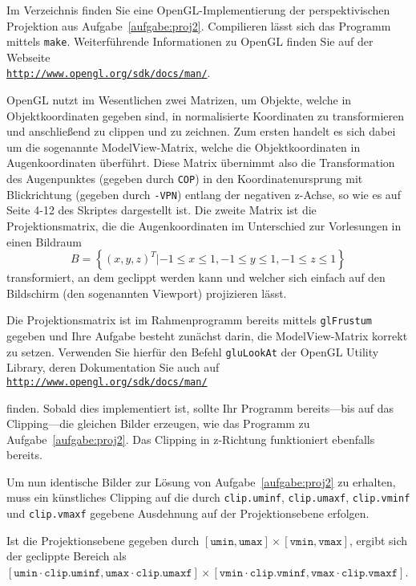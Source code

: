 %
Im Verzeichnis  finden Sie eine 
OpenGL-Implementierung der perspektivischen
Projektion aus Aufgabe~\ref{aufgabe:proj2}. Compilieren lässt sich das 
Programm mittels \texttt{make}. Weiterführende Informationen zu OpenGL 
finden Sie auf der Webseite\\
\href{http://www.opengl.org/sdk/docs/man/}{\texttt{http://www.opengl.org/sdk/docs/man/}}.

OpenGL nutzt im Wesentlichen zwei Matrizen, um Objekte, welche in 
Objektkoordinaten gegeben sind, in normalisierte Koordinaten zu 
transformieren und anschließend zu clippen und zu zeichnen. Zum ersten 
handelt es sich dabei um die sogenannte ModelView-Matrix, welche die 
Objektkoordinaten in Augenkoordinaten überführt. Diese Matrix übernimmt 
also die Transformation des Augenpunktes (gegeben durch \texttt{COP}) in
den Koordinatenursprung mit Blickrichtung (gegeben durch \texttt{-VPN}) 
entlang der negativen z-Achse, so wie es auf Seite 4-12 des Skriptes 
dargestellt ist. Die zweite Matrix ist die Projektionsmatrix, die die 
Augenkoordinaten im Unterschied zur Vorlesungen in einen Bildraum
\[B = \left\{(x,y,z)^T | -1\leq x\leq 1,-1\leq y\leq 1,-1\leq z\leq 1\right\}\] 
transformiert, an dem geclippt werden kann und welcher sich einfach auf 
den Bildschirm (den sogenannten Viewport) projizieren lässt.

Die Projektionsmatrix ist im Rahmenprogramm bereits mittels 
\texttt{glFrustum} gegeben und Ihre Aufgabe besteht zunächst darin, die 
ModelView-Matrix korrekt zu setzen. Verwenden Sie hierfür den Befehl 
\texttt{gluLookAt} der OpenGL Utility Library, deren Dokumentation Sie 
auch auf\\
\href{http://www.opengl.org/sdk/docs/man/}{\texttt{http://www.opengl.org/sdk/docs/man/}}

finden. Sobald dies implementiert ist, sollte Ihr Programm bereits---bis
auf das Clipping---die gleichen Bilder erzeugen, wie das Programm zu 
Aufgabe~\ref{aufgabe:proj2}. Das Clipping in z-Richtung funktioniert 
ebenfalls bereits.

Um nun identische Bilder zur Lösung von Aufgabe~\ref{aufgabe:proj2} zu 
erhalten, muss ein künstliches Clipping auf die durch 
\texttt{clip.uminf}, \texttt{clip.umaxf}, \texttt{clip.vminf} und 
\texttt{clip.vmaxf} gegebene Ausdehnung auf der Projektionsebene 
erfolgen. 

Ist die Projektionsebene gegeben durch 
$[\texttt{umin}, \texttt{umax}] \times [\texttt{vmin}, \texttt{vmax}]$, 
ergibt sich der geclippte Bereich als 
$[\texttt{umin} \cdot \texttt{clip.uminf}, \texttt{umax} \cdot \texttt{clip.umaxf}] \times [\texttt{vmin} \cdot \texttt{clip.vminf}, \texttt{vmax} \cdot \texttt{clip.vmaxf}]$.

